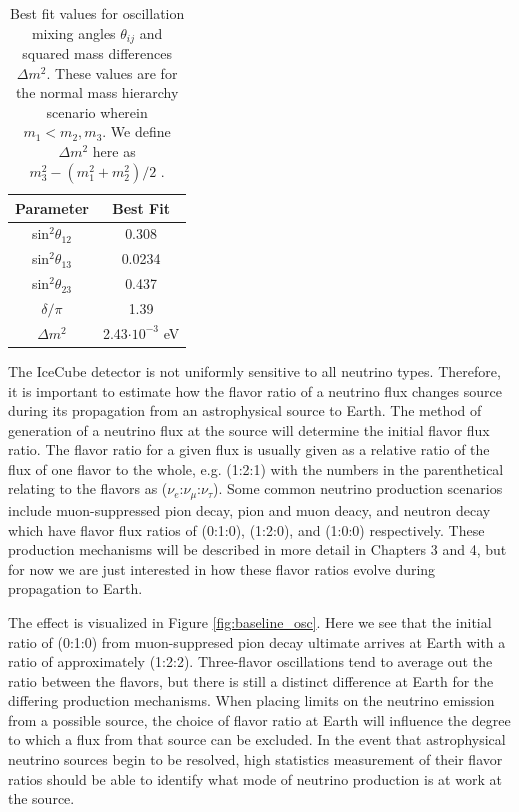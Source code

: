 \documentclass{gatech-thesis}
\begin{document}
\begin{table}[h]
\caption[Best Fit Neutrino Oscillation Parameters]{Best fit values for oscillation mixing angles $\theta_{ij}$ and squared mass differences $\Delta m^{2}$. These values are for the normal mass hierarchy scenario wherein $m_1 < m_2 , m_3$. We define $\Delta m^{2}$ here as $m_{3}^2 - (m_1^2 + m_2^2)/2$ \cite{PhysRevD.89.093018}.\label{tab:osc_param}}
\begin{center}
\begin{tabular}{cc}
\hline
\textbf{Parameter} &\textbf{ Best Fit}\\
\hline
sin$^2 \theta_{12}$ & 0.308\\
sin$^2 \theta_{13}$ & 0.0234\\
sin$^2 \theta_{23}$ & 0.437\\
$\delta / \pi$ & 1.39 \\
$\Delta m^2$ & 2.43$\cdot 10^{-3}$ eV\\
\hline
\end{tabular}
\end{center}
\end{table}

The IceCube detector is not uniformly sensitive to all neutrino types. Therefore, it is important to estimate how the flavor ratio of a neutrino flux changes source during its propagation from an astrophysical source to Earth. The method of generation of a neutrino flux at the source will determine the initial flavor flux ratio. The flavor ratio for a given flux is usually given as a relative ratio of the flux of one flavor to the whole, e.g. (1:2:1) with the numbers in the parenthetical relating to the flavors as ($\nu_e$:$\nu_{\mu}$:$\nu_{\tau}$). Some common neutrino production scenarios include muon-suppressed pion decay, pion and muon deacy, and neutron decay which have flavor flux ratios of (0:1:0), (1:2:0), and (1:0:0) respectively. These production mechanisms will be described in more detail in Chapters 3 and 4, but for now we are just interested in how these flavor ratios evolve during propagation to Earth. 

The effect is visualized in Figure \ref{fig:baseline_osc}. Here we see that the initial ratio of (0:1:0) from muon-suppresed pion decay ultimate arrives at Earth with a ratio of approximately (1:2:2). Three-flavor oscillations tend to average out the ratio between the flavors, but there is still a distinct difference at Earth for the differing production mechanisms. When placing limits on the neutrino emission from a possible source, the choice of flavor ratio at Earth will influence the degree to which a flux from that source can be excluded. In the event that astrophysical neutrino sources begin to be resolved, high statistics measurement of their flavor ratios should be able to identify what mode of neutrino production is at work at the source.
\end{document}
